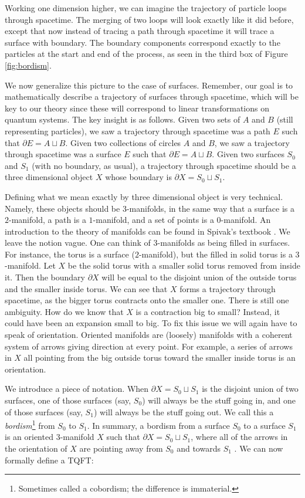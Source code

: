 \documentclass{article}
\theoremstyle{definition}
\numberwithin{figure}{section}
\begin{document}
Working one dimension higher, we can imagine the trajectory of particle loops through spacetime. The merging of two loops will look exactly like it did before, except that now instead of tracing a path through spacetime it will trace a surface with boundary. The boundary components correspond exactly to the particles at the start and end of the process, as seen in the third box of Figure \ref{fig:bordism}.

We now generalize this picture to the case of surfaces. Remember, our goal is to mathematically describe a trajectory of surfaces through spacetime, which will be key to our theory since these will correspond to linear transformations on quantum systems. The key insight is as follows. Given two sets of $A$ and $B$ (still representing particles), we saw a trajectory through spacetime was a path $E$ such that $\partial E=A\sqcup B$. Given two collections of circles $A$ and $B$, we saw a trajectory through spacetime was a surface $E$ such that $\partial E=A\sqcup B$. Given two surfaces $S_0$ and $S_1$ (with no boundary, as usual), a trajectory through spacetime should be a three dimensional object $X$ whose boundary is $\partial X= S_0\sqcup S_1$.

Defining what we mean exactly by three dimensional object is very technical. Namely, these objects should be $3$-manifolds, in the same way that a surface is a $2$-manifold, a path is a $1$-manifold, and a set of points is a $0$-manifold. An introduction to the theory of manifolds can be found in Spivak's textbook \cite{spivak2018calculus}. We leave the notion vague. One can think of 3-manifolds as being filled in surfaces. For instance, the torus is a surface ($2$-manifold), but the filled in solid torus is a $3$-manifold. Let $X$ be the solid torus with a smaller solid torus removed from inside it. Then the boundary $\partial X$ will be equal to the disjoint union of the outside torus and the smaller inside torus. We can see that $X$ forms a trajectory through spacetime, as the bigger torus contracts onto the smaller one. There is still one ambiguity. How do we know that $X$ is a contraction big to small? Instead, it could have been an expansion small to big. To fix this issue we will again have to speak of orientation. Oriented manifolds are (loosely) manifolds with a coherent system of arrows giving direction at every point. For example, a series of arrows in $X$ all pointing from the big outside torus toward the smaller inside torus is an orientation.

We introduce a piece of notation. When $\partial X = S_0 \sqcup S_1$ is the disjoint union of two surfaces, one of those surfaces (say, $S_0$) will always be the stuff going in, and one of those surfaces (say, $S_1$) will always be the stuff going out. We call this a \textit{bordism}\footnote{Sometimes called a cobordism; the difference is immaterial.} from $S_0$ to $S_1$. In summary, a bordism from a surface $S_0$ to a surface $S_1$ is an oriented $3$-manifold $X$ such that $\partial X = S_0\sqcup S_1$, where all of the arrows in the orientation of $X$ are pointing away from $S_0$ and towards $S_1$ . We can now formally define a TQFT:
\end{document}
